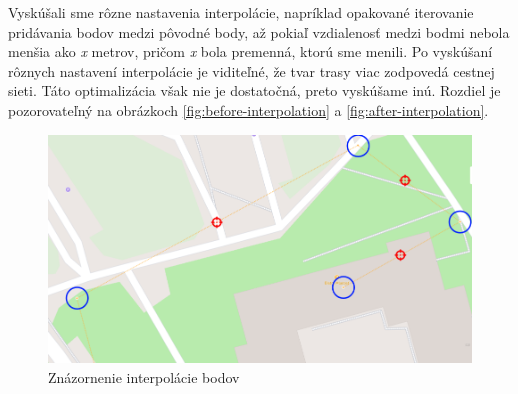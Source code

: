 Vyskúšali sme rôzne nastavenia interpolácie, napríklad opakované iterovanie pridávania bodov medzi pôvodné body, až pokiaľ vzdialenosť medzi bodmi nebola menšia ako \textit{x} metrov, pričom \textit{x} bola premenná, ktorú sme menili. Po vyskúšaní rôznych nastavení interpolácie je viditeľné, že tvar trasy viac zodpovedá cestnej sieti. Táto optimalizácia však nie je dostatočná, preto vyskúšame inú. Rozdiel je pozorovateľný na obrázkoch \ref{fig:before-interpolation} a \ref{fig:after-interpolation}.
\begin{figure}[H]
    \centering
    \includegraphics[width=.7\textwidth]{img/interpolacia bodov/interpolacia bodov.png}
    \caption{Znázornenie interpolácie bodov}
    \label{fig:pts-interpolation}
\end{figure}
